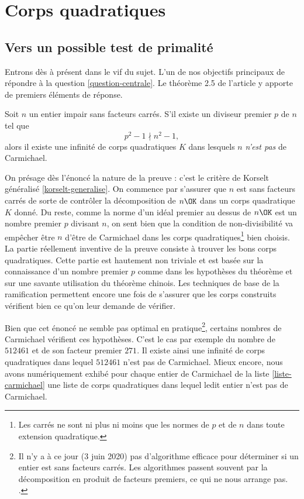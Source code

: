 \section{Corps quadratiques}

\subsection{Vers un possible test de primalité}

Entrons dès à présent dans le vif du sujet. L'un de nos objectifs principaux de répondre à la question \ref{question-centrale}. Le théorème 2.5 de l'article y apporte de premiers éléments de réponse.

\begin{theoreme}\label{theoreme-2.5}
	Soit $n$ un entier impair sans facteurs carrés. S'il existe un diviseur premier $p$ de $n$ tel que $$p^2 - 1 \nmid n^2 - 1,$$ alors il existe une infinité de corps quadratiques $K$ dans lesquels $n$ \emph{n'est pas} de Carmichael.
\end{theoreme}

\begin{MotSurPreuve}
	On présage dès l'énoncé la nature de la preuve : c'est le critère de Korselt généralisé \ref{korselt-generalise}. On commence par s'assurer que $n$ est sans facteurs carrés de sorte de contrôler la décomposition de $n\OK$ dans un corps quadratique $K$ donné. Du reste, comme la norme d'un idéal premier au dessus de $n\OK$ est un nombre premier $p$ divisant $n$, on sent bien que la condition de non-divisibilité va empêcher être $n$ d'être de Carmichael dans les corps quadratiques\footnote{Les carrés ne sont ni plus ni moins que les normes de $p$ et de $n$ dans toute extension quadratique.} bien choisis. La partie réellement inventive de la preuve consiste à trouver les bons corps quadratiques. Cette partie est hautement non triviale et est basée sur la connaissance d'un nombre premier $p$ comme dans les hypothèses du théorème et sur une savante utilisation du théorème chinois. Les techniques de base de la ramification permettent encore une fois de s'assurer que les corps construits vérifient bien ce qu'on leur demande de vérifier. \\
\end{MotSurPreuve}

Bien que cet énoncé ne semble pas optimal en pratique\footnote{Il n'y a à ce jour (3 juin 2020) pas d'algorithme efficace pour déterminer si un entier est sans facteurs carrés. Les algorithmes passent souvent par la décomposition en produit de facteurs premiers, ce qui ne nous arrange pas. .}, certains nombres de Carmichael vérifient ces hypothèses. C'est le cas par exemple du nombre de $512461$ et de son facteur premier $271$. Il existe ainsi une infinité de corps quadratiques dans lequel $512461$ n'est pas de Carmichael. Mieux encore, nous avons numériquement exhibé pour chaque entier de Carmichael de la liste \ref{liste-carmichael} une liste de corps quadratiques dans lequel ledit entier n'est pas de Carmichael.  \\

